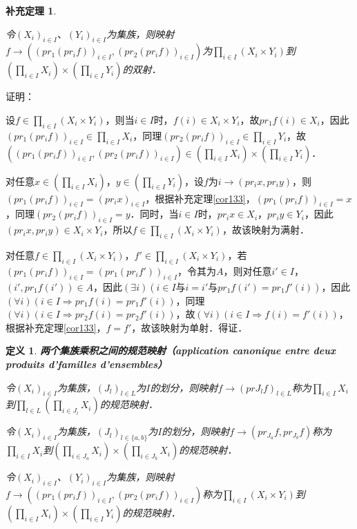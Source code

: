 \documentclass[12pt, a4paper, oneside]{book}
\newtheorem{cor}{补充定理}
\newtheorem{de}{定义}
\begin{document}
			\begin{cor}\label{cor139}
				\hfill\par
				令$(X_i)_{i\in I}$、$(Y_i)_{i\in I}$为集族，则映射$f\to ((pr_1(pr_if))_{i\in I}, (pr_2(pr_if))_{i\in I})$为$\prod\limits_{i\in I}(X_i\times Y_i)$到\\$(\prod\limits_{i\in I}X_i)\times (\prod\limits_{i\in I}Y_i)$的双射．
			\end{cor}
			证明：
			\par
			设$f\in \prod\limits_{i\in I}(X_i\times Y_i)$，则当$i\in I$时，$f(i)\in X_i\times Y_i$，故$pr_1f(i)\in X_i$，因此$(pr_1(pr_if))_{i\in I}\in \prod\limits_{i\in I}X_i$，同理$(pr_2(pr_if))_{i\in I}\in \prod\limits_{i\in I}Y_i$，故$((pr_1(pr_if))_{i\in I}, (pr_2(pr_if))_{i\in I})\in (\prod\limits_{i\in I}X_i)\times (\prod\limits_{i\in I}Y_i)$．
			\par
			对任意$x\in (\prod\limits_{i\in I}X_i)$，$y\in (\prod\limits_{i\in I}Y_i)$，设$f$为$i\to (pr_ix, pr_iy)$，则$(pr_1(pr_if))_{i\in I}=(pr_ix)_{i\in I}$，根据补充定理\ref{cor133}，$(pr_1(pr_if))_{i\in I}=x$，同理$(pr_2(pr_if))_{i\in I}=y$．同时，当$i\in I$时，$pr_ix \in X_i$，$pr_iy \in Y_i$，因此$(pr_ix, pr_iy)\in X_i \times Y_i$，所以$f\in \prod\limits_{i\in I}(X_i\times Y_i)$，故该映射为满射．
			\par
			对任意$f\in \prod\limits_{i\in I}(X_i\times Y_i)$，$f'\in \prod\limits_{i\in I}(X_i\times Y_i)$，若$(pr_1(pr_if))_{i\in I}=(pr_1(pr_if'))_{i\in I}$，令其为$A$，则对任意$i'\in I$，$(i', pr_1f(i'))\in A$，因此$(\exists i)(i\in I\text{与}i=i'\text{与}pr_1f(i')=pr_1f'(i))$，因此$(\forall i)(i\in I\Rightarrow pr_1f(i)=pr_1f'(i))$，同理$(\forall i)(i\in I\Rightarrow pr_2f(i)=pr_2f'(i))$，故$(\forall i)(i\in I\Rightarrow f(i)=f'(i))$，根据补充定理\ref{cor133}，$f=f'$，故该映射为单射．得证．
			
			\begin{de}
				\textbf{两个集族乘积之间的规范映射（application canonique entre deux produits d'familles d'ensembles）}
				\par
				令$(X_i)_{i\in I}$为集族，$(J_l)_{l\in L}$为$I$的划分，则映射$f\to (prJ_lf)_{l\in L}$称为$\prod\limits_{i\in I}X_i$到$\prod\limits_{l\in L}(\prod\limits_{i\in J_l}X_i)$的规范映射．
				\par
				令$(X_i)_{i\in I}$为集族，$(J_l)_{l\in \{a, b\}}$为$I$的划分，则映射$f\to (pr_{J_a}f, pr_{J_b}f)$称为$\prod\limits_{i\in I}X_i$到$(\prod\limits_{i\in J_a}X_i)\times (\prod\limits_{i\in J_b}X_i)$的规范映射．
				\par
				令$(X_i)_{i\in I}$、$(Y_i)_{i\in I}$为集族，则映射$f\to ((pr_1(pr_if))_{i\in I}, (pr_2(pr_if))_{i\in I})$称为$\prod\limits_{i\in I}(X_i\times Y_i)$到\\$(\prod\limits_{i\in I}X_i)\times (\prod\limits_{i\in I}Y_i)$的规范映射．
			\end{de}
			
\end{document}
